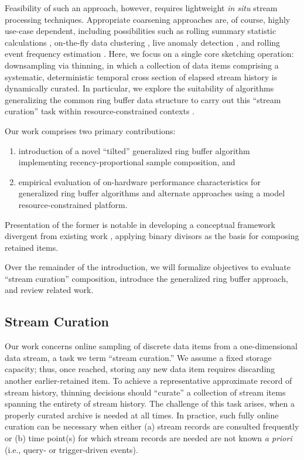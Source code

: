 Feasibility of such an approach, however, requires lightweight \textit{in situ} stream processing techniques.
Appropriate coarsening approaches are, of course, highly use-case dependent, including possibilities such as rolling summary statistic calculations \citep{lin2004continuously}, on-the-fly data clustering \citep{silva2013data}, live anomaly detection \citep{cai2004maids}, and rolling event frequency estimation \citep{manku2002approximate}.
Here, we focus on a single core sketching operation: downsampling via thinning, in which a collection of data items comprising a systematic, deterministic temporal cross section of elapsed stream history is dynamically curated.
In particular, we explore the suitability of algorithms generalizing the common ring buffer data structure to carry out this ``stream curation'' task  within resource-constrained contexts \citep{gunther2014compressing}.

Our work comprises two primary contributions:
\begin{enumerate}
\item introduction of a novel ``tilted'' generalized ring buffer algorithm implementing recency-proportional sample composition, and
\item empirical evaluation of on-hardware performance characteristics for generalized ring buffer algorithms and alternate approaches using a model resource-constrained platform.
\end{enumerate}
Presentation of the former is notable in developing a conceptual framework divergent from existing work \citep{gunther2014compressing}, applying binary divisors as the basis for composing retained items.

Over the remainder of the introduction, we will formalize objectives to evaluate ``stream curation'' composition, introduce the generalized ring buffer approach, and review related work.

\subsection{Stream Curation}
\label{sec:stream-curation-problem}

Our work concerns online sampling of discrete data items from a one-dimensional data stream, a task we term ``stream curation.''
We assume a fixed storage capacity; thus, once reached, storing any new data item requires discarding another earlier-retained item.
To achieve a representative approximate record of stream history, thinning decisions should ``curate'' a collection of stream items spanning the entirety of stream history.
The challenge of this task arises, when a properly curated archive is needed at all times.
In practice, such fully online curation can be necessary when either (a) stream records are consulted frequently or (b) time point(s) for which stream records are needed are not known \textit{a priori} (i.e., query- or trigger-driven events).

